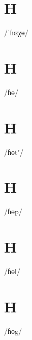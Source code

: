 \documentclass[10pt,a4paper,twoside]{book}
\begin{document}
\section*{H}

\begin{multicols}{3}
 {/ˈɦɶχʉ/} {}
\end{multicols}

\section*{H}

\begin{multicols}{3}
 {/ɦɵ/} {}
\end{multicols}

\section*{H}

\begin{multicols}{3}
 {/ɦɵtʼ/} {}
\end{multicols}

\section*{H}

\begin{multicols}{3}
 {/ɦɵp/} {}
\end{multicols}

\section*{H}

\begin{multicols}{3}
 {/ɦɵǁ/} {}
\end{multicols}

\section*{H}

\begin{multicols}{3}
 {/ɦɵg/} {}
\end{multicols}
\end{document}
